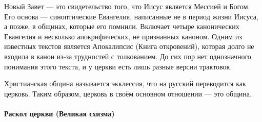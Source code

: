 
Новый Завет — это свидетельство того, что Иисус является Мессией и Богом. Его основа — синоптические Евангелия, написанные не в период жизни Иисуса, а позже, в общинах, которые его помнили. Включает четыре канонических Евангелия и несколько апокрифических, не признанных каноном. Одним из известных текстов является Апокалипсис (Книга откровений), которая долго не входила в канон из-за трудностей с толкованием. До сих пор нет однозначного понимания этого текста, и у церкви есть лишь разные версии трактовок.

Христианская община называется экклессия, что на русский переводится как церковь. Таким образом, церковь в своём основном отношении — это община.

\paragraph{Раскол церкви (Великая схизма)}

